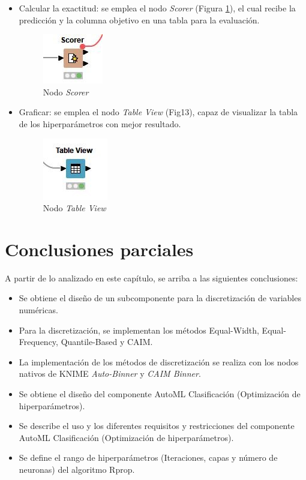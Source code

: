 \begin{itemize}
	\item Calcular la exactitud: se emplea el nodo \textit{Scorer} (Figura \ref{fig:nodo-scorer}), el cual recibe la predicción y la columna objetivo en una tabla para la evaluación. 
	\begin{figure}[H]
		\centering
		\includegraphics[width=0.15\linewidth]{"figuras/capi 2/nodo-scorer"}
		\caption[Nodo Scorer]{Nodo \textit{Scorer}}
		\label{fig:nodo-scorer}
	\end{figure}
	
	\item Graficar: se emplea el nodo \textit{Table View} (Fig13), capaz de visualizar la tabla de los hiperparámetros con mejor resultado.
	\begin{figure}[H]
		\centering
		\includegraphics[width=0.15\linewidth]{"figuras/capi 2/nodo-table-view"}
		\caption[Nodo Table View]{Nodo \textit{Table View}}
		\label{fig:nodo-table-view}
	\end{figure}
	
\end{itemize}

\section{Conclusiones parciales}
A partir de lo analizado en este capítulo, se arriba a las siguientes conclusiones:
\begin{itemize}
	\item Se obtiene el diseño de un subcomponente para la discretización de variables numéricas.
	\item Para la discretización, se implementan los métodos Equal-Width, Equal-Frequency, Quantile-Based y CAIM.
	\item La implementación de los métodos de discretización se realiza con los nodos nativos de KNIME \textit{Auto-Binner} y \textit{CAIM Binner}.
	\item Se obtiene el diseño del componente AutoML Clasificación (Optimización de hiperparámetros).
	\item Se describe el uso y  los diferentes requisitos y restricciones del componente AutoML Clasificación (Optimización de hiperparámetros).
	\item Se define el rango de hiperparámetros (Iteraciones, capas y número de neuronas) del algoritmo Rprop.
\end{itemize}

\pagebreak

